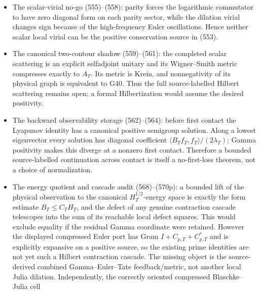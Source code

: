 \documentclass[11pt]{article}
\begin{document}
\begin{itemize}
      residue traces, because they are entire while the completed
      logarithmic derivative has nonzero residues.  The correct limit is a
      finite-part bulk plus an explicit residue-defect coordinate.
      Factoring the resulting positive boundary Gram through \(H_T\) is
      equivalent on the first-loss kernel to the desired terminal
      vanishing, so a Sylvester or pseudoinverse construction is circular.
\item The scalar-virial no-go (555)--(558): parity forces the logarithmic
      commutator to have zero diagonal form on each parity sector, while
      the dilation virial changes sign because of the high-frequency Euler
      oscillations.  Hence neither scalar local virial can be the positive
      conservation source in (553).
\item The canonical two-contour shadow (559)--(561): the completed scalar
      scattering is an explicit selfadjoint unitary and its Wigner--Smith
      metric compresses exactly to \(A_T\).  Its metric is Krein, and
      nonnegativity of its physical graph is equivalent to G40.  Thus the
      full source-labelled Hilbert scattering remains open; a formal
      Hilbertization would assume the desired positivity.
\item The backward observability storage (562)--(564): before first contact
      the Lyapunov identity has a canonical positive semigroup solution.
      Along a lowest eigenvector every solution has diagonal coefficient
      \(\langle B_Tf_T,f_T\rangle/(2\lambda_T)\); Gamma positivity makes
      this diverge at a nonzero first contact.  Therefore a bounded
      source-labelled continuation across contact is itself a no-first-loss
      theorem, not a choice of normalization.
\item The energy quotient and cascade audit (568)--(570p): a bounded lift of
      the physical observation to the canonical \(H_T^{1/2}\)-energy space
      is exactly the form estimate \(B_T\le C_TH_T\), and the defect of any
      genuine contraction cascade telescopes into the sum of its reachable
      local defect squares.  This would exclude equality if the residual
      Gamma coordinate were retained.  However the displayed compressed
      Euler port has Gram \(I+C_{p,T}+C_{p,T}^*\) and is explicitly expansive
      on a positive source, so the existing prime identities are not yet
      such a Hilbert contraction cascade.  The missing object is the
      source-derived combined Gamma--Euler--Tate feedback/metric, not another
      local Julia dilation.
      Independently, the correctly oriented compressed Blaschke--Julia cell

\end{itemize}
\end{document}
